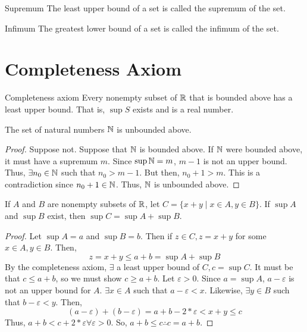 \begin{definition}{Supremum}{}
    The least upper bound of a set is called the supremum of the set.
\end{definition}
\begin{definition}{Infimum}{}
    The greatest lower bound of a set is called the infimum of the set.
\end{definition}

\section{Completeness Axiom}
\begin{definition}{Completeness axiom}{}
    Every nonempty subset of $\mathbb{R}$ that is bounded above has a least upper bound. That is, $\sup S$ exists and is a real number.
\end{definition}

\begin{theorem}{}{}
    The set of natural numbers $\mathbb{N}$ is unbounded above.
\end{theorem}
\begin{proof}
    Suppose not. Suppose that $\mathbb{N}$ is bounded above. If $\mathbb{N}$ were bounded above, it must have a supremum $m$. Since $\sup \mathbb{N} = m$, $m - 1$ is not an upper bound. Thus, $\exists n_0 \in \mathbb{N}$ such that $n_0 > m - 1$. But then, $n_0 + 1 > m$. This is a contradiction since $n_0 + 1 \in \mathbb{N}$. Thus, $\mathbb{N}$ is unbounded above.
\end{proof}

\begin{theorem}{}{}
    If $A$ and $B$ are nonempty subsets of $\mathbb{R}$, let $C = \{x + y \mid x \in A, y \in B\}$. If $\sup A$ and $\sup B$ exist, then $\sup C = \sup A + \sup B$.
\end{theorem}
\begin{proof}
    Let $\sup A = a$ and $\sup B = b$. Then if $z \in C, z = x + y$ for some $x \in A, y \in B$. Then,
    $$ z = x + y \leq a + b = \sup A + \sup B $$
    By the completeness axiom, $\exists$ a least upper bound of $C, c = \sup C$. It must be that $c \leq a + b$, so we must show $c \geq a + b$. Let $\varepsilon > 0$. Since $a = \sup A$, $a - \varepsilon$ is not an upper bound for $A$. $\exists x \in A$ such that $a - \varepsilon < x$. Likewise, $\exists y \in B$ such that $b - \varepsilon < y$. Then,
    $$ (a - \varepsilon) + (b - \varepsilon) = a + b - 2 * \varepsilon < x + y \leq c $$
    Thus, $a + b < c + 2 * \varepsilon \forall \varepsilon > 0$. So, $a + b \leq c \therefore c = a + b$.
\end{proof}